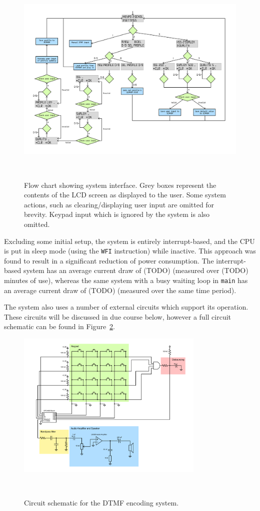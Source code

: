 \documentclass[11pt,a4paper,twocolumn]{scrartcl}
\begin{document}
   \begin{figure}
      \centering
      \includegraphics[height=0.67\textheight, angle=90]{system_flow_chart}
      \caption{Flow chart showing system interface. Grey boxes represent the contents of the LCD screen as displayed to the user. Some system actions, such as clearing/displaying user input are omitted for brevity. Keypad input which is ignored by the system is also omitted.}~\label{fig:system-interface}
   \end{figure}

   Excluding some initial setup, the system is entirely interrupt-based, and the CPU is put in sleep mode (using the \verb!WFI! instruction) while inactive. This approach was found to result in a significant reduction of power consumption. The interrupt-based system has an average current draw of (TODO) (measured over (TODO) minutes of use), whereas the same system with a busy waiting loop in \verb!main! has an average current draw of (TODO) (measured over the same time period).

   The system also uses a number of external circuits which support its operation. These circuits will be discussed in due course below, however a full circuit schematic can be found in Figure~\ref{fig:circuit-schematic}.

   \begin{figure}
      \centering
      \includegraphics[width=0.8\textwidth]{circuit_schematic}
      \caption{Circuit schematic for the DTMF encoding system.}~\label{fig:circuit-schematic}
   \end{figure}
\end{document}
